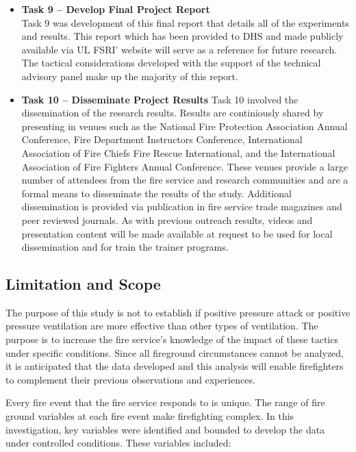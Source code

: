 \documentclass{article}
\begin{document}
\begin{itemize}
	\item \textbf{Task 9 – Develop Final Project Report} \\
	Task 9 was development of this final report that details all of the experiments and results. This report which has been provided to DHS and made publicly available via UL FSRI' website will serve as a reference for future research. The tactical considerations developed with the support of the technical advisory panel make up the majority of this report.
	
	\item \textbf{Task 10 – Disseminate Project Results}
	Task 10 involved the dissemination of the research results. Results are continiously shared by presenting in venues such as the National Fire Protection Association Annual Conference, Fire Department Instructors Conference, International Association of Fire Chiefs Fire Rescue International, and the International Association of Fire Fighters Annual Conference. These venues provide a large number of attendees from the fire service and research communities and are a formal means to disseminate the results of the study. Additional dissemination is provided via publication in fire service trade magazines and peer reviewed journals. As with previous outreach results, videos and presentation content will be made available at request to be used for local dissemination and for train the trainer programs. 

\end{itemize}

\subsection{Limitation and Scope}

The purpose of this study is not to establish if positive pressure attack or positive pressure ventilation are more effective than other types of ventilation. The purpose is to increase the fire service’s knowledge of the impact of these tactics under specific conditions. Since all fireground circumstances cannot be analyzed, it is anticipated that the data developed and this analysis will enable firefighters to complement their previous observations and experiences.

Every fire event that the fire service responds to is unique. The range of fire ground variables at each fire event make firefighting complex. In this investigation, key variables were identified and bounded to develop the data under controlled conditions. These variables included:
\end{document}

